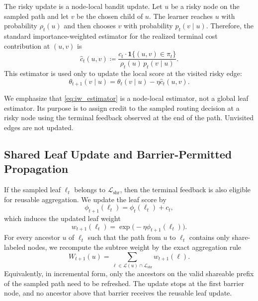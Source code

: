 \documentclass{article}
\begin{document}
The risky update is a node-local bandit update. Let $u$ be a risky node on the sampled path and let $v$ be the chosen child of $u$. The learner reaches $u$ with probability $\rho_t(u)$ and then chooses $v$ with probability $p_t(v\mid u)$. Therefore, the standard importance-weighted estimator for the realized terminal cost contribution at $(u,v)$ is
\begin{equation}
    \widehat{c}_t(u,v)
    \coloneqq
    \frac{c_t \cdot \mathbf{1}\{(u,v)\in\pi_t\}}{\rho_t(u)\,p_t(v\mid u)}.
    \label{eq:iw_estimator}
\end{equation}
This estimator is used only to update the local score at the visited risky edge:
\begin{equation}
    \theta_{t+1}(v\mid u)
    =
    \theta_t(v\mid u) - \eta \widehat{c}_t(u,v).
    \label{eq:risky_local_update}
\end{equation}

We emphasize that \eqref{eq:iw_estimator} is a node-local estimator, not a global leaf estimator. Its purpose is to assign credit to the sampled routing decision at a risky node using the terminal feedback observed at the end of the path. Unvisited edges are not updated.

\subsection{Shared Leaf Update and Barrier-Permitted Propagation}
\label{sec:barriershare_shared_update}

If the sampled leaf $\ell_t$ belongs to $\mathcal{L}_{\mathrm{shr}}$, then the terminal feedback is also eligible for reusable aggregation. We update the leaf score by
\begin{equation}
    \phi_{t+1}(\ell_t) = \phi_t(\ell_t) + c_t,
    \label{eq:leaf_score_update}
\end{equation}
which induces the updated leaf weight
\begin{equation}
    w_{t+1}(\ell_t) = \exp\!\bigl(-\eta \phi_{t+1}(\ell_t)\bigr).
    \label{eq:leaf_weight_update}
\end{equation}
For every ancestor $u$ of $\ell_t$ such that the path from $u$ to $\ell_t$ contains only share-labeled nodes, we recompute the subtree weight by the exact aggregation rule
\begin{equation}
    W_{t+1}(u) = \sum_{\ell \in \mathcal{L}(u)\cap \mathcal{L}_{\mathrm{shr}}} w_{t+1}(\ell).
    \label{eq:subtree_weight_update}
\end{equation}
Equivalently, in incremental form, only the ancestors on the valid shareable prefix of the sampled path need to be refreshed. The update stops at the first barrier node, and no ancestor above that barrier receives the reusable leaf update.
\end{document}
